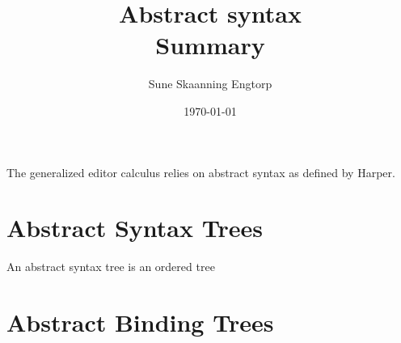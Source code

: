 \documentclass{article}
\title{Abstract syntax \\ Summary}
\date{\today}
\author{Sune Skaanning Engtorp}
\begin{document}
\maketitle

The generalized editor calculus\cite{aalborg} relies on abstract syntax as defined by Harper\cite{harper}.

\section{Abstract Syntax Trees}
An abstract syntax tree is an ordered tree 

\section{Abstract Binding Trees}

\printbibliography
\end{document}
